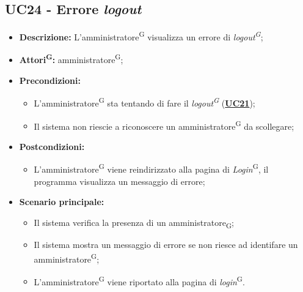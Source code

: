 \subsection{UC24 - Errore \textit{logout}}
\label{sec:UC24}
\begin{itemize}
	\item \textbf{Descrizione:} L’amministratore\textsuperscript{G} visualizza un errore di \textit{logout\textsuperscript{G}};
	\item \textbf{Attori\textsuperscript{G}:} amministratore\textsuperscript{G};
	\item \textbf{Precondizioni:} 
	\begin{itemize}
		\item L’amministratore\textsuperscript{G} sta tentando di fare il \textit{logout\textsuperscript{G}} (\hyperref[sec:UC21]{\textbf{UC21}});
		\item Il sistema non riescie a riconoscere un amministratore\textsuperscript{G} da scollegare;
	\end{itemize}
	\item \textbf{Postcondizioni:} 
	\begin{itemize}
		\item L'amministratore\textsuperscript{G} viene reindirizzato alla pagina di \textit{Login}\textsuperscript{G}, il programma visualizza un messaggio di errore;
	\end{itemize}
	\item \textbf{Scenario principale:} 
	\begin{itemize}
		\item Il sistema verifica la presenza di un amministratore\textsubscript{G};
		\item Il sistema mostra un messaggio di errore se non riesce ad identifare un amministratore\textsuperscript{G};
		\item L'amministratore\textsuperscript{G} viene riportato alla pagina di \textit{login}\textsuperscript{G}.
	\end{itemize}
\end{itemize}

